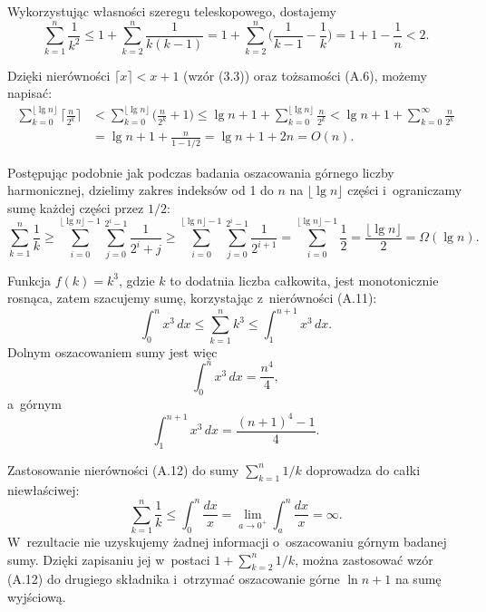 
\exercise %
Wykorzystując własności szeregu teleskopowego, dostajemy
\[
	\sum_{k=1}^n\frac{1}{k^2} \le 1+\sum_{k=2}^n\frac{1}{k(k-1)} = 1+\sum_{k=2}^n\biggl(\frac{1}{k-1}-\frac{1}{k}\biggr) = 1+1-\frac{1}{n} < 2.
\]

\exercise %
Dzięki nierówności $\lceil x\rceil<x+1$ (wzór (3.3)) oraz tożsamości (A.6), możemy napisać:
\begin{align*}
	\sum_{k=0}^{\lfloor\lg n\rfloor}\biggl\lceil\frac{n}{2^k}\biggr\rceil &< \sum_{k=0}^{\lfloor\lg n\rfloor}\biggl(\frac{n}{2^k}+1\biggr) \le \lg n+1+\sum_{k=0}^{\lfloor\lg n\rfloor}\frac{n}{2^k} < \lg n+1+\sum_{k=0}^\infty\frac{n}{2^k} \\[2mm]
	&= \lg n+1+\frac{n}{1-1/2} = \lg n+1+2n = O(n).
\end{align*}

\exercise %
Postępując podobnie jak podczas badania oszacowania górnego  liczby harmonicznej, dzielimy zakres indeksów od 1 do $n$ na $\lfloor\lg n\rfloor$ części i~ograniczamy sumę każdej części przez $1/2$:
\[
    \sum_{k=1}^n\frac{1}{k} \ge \sum_{i=0}^{\lfloor\lg n\rfloor-1}\sum_{j=0}^{2^i-1}\frac{1}{2^i+j} \ge \sum_{i=0}^{\lfloor\lg n\rfloor-1}\sum_{j=0}^{2^i-1}\frac{1}{2^{i+1}} = \sum_{i=0}^{\lfloor\lg n\rfloor-1}\frac{1}{2} = \frac{\lfloor\lg n\rfloor}{2} = \Omega(\lg n).
\]

\exercise %
Funkcja $f(k)=k^3$, gdzie $k$ to dodatnia liczba całkowita, jest monotonicznie rosnąca, zatem szacujemy sumę, korzystając z~nierówności (A.11):
\[
	\int_0^nx^3\,dx \le \sum_{k=1}^nk^3 \le \int_1^{n+1}x^3\,dx.
\]
Dolnym oszacowaniem sumy jest więc
\[
	\int_0^nx^3\,dx = \frac{n^4}{4},
\]
a~górnym
\[
	\int_1^{n+1}x^3\,dx = \frac{(n+1)^4-1}{4}.
\]

\exercise %
Zastosowanie nierówności (A.12) do sumy $\sum_{k=1}^n1/k$ doprowadza do całki niewłaściwej:
\[
	\sum_{k=1}^n\frac{1}{k} \le \int_0^n\frac{dx}{x} = \lim_{a\to0^+}\int_a^n\frac{dx}{x} = \infty.
\]
W~rezultacie nie uzyskujemy żadnej informacji o~oszacowaniu górnym badanej sumy.
Dzięki zapisaniu jej w~postaci $1+\sum_{k=2}^n1/k$, można zastosować wzór (A.12) do drugiego składnika i~otrzymać oszacowanie górne $\ln n+1$ na sumę wyjściową.
